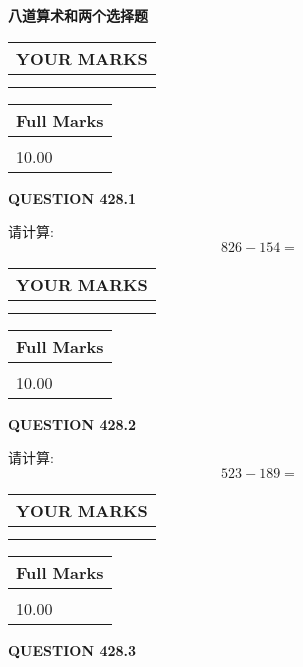 \documentclass{ctexart}
\begin{document}
   
 \vspace{0.2in}
{\LARGE {\textbf{ 八道算术和两个选择题}}}
   
   
  
\vspace{0.2in}
  
\noindent\begin{tabular}{|l|}
\hline
 YOUR MARKS  \\
\hline
 \\ 
 \\ 
\hline
\end{tabular}
\hspace{0.05in} \begin{tabular}{|l|}
\hline
 Full Marks  \\
\hline
 \\ 
10.00 \\
\hline
\end{tabular}
{\textbf{\Large{QUESTION
428.1 
}}}
  
  
 
请计算:
\begin{equation}
826 -   %
154 = \nonumber
\end{equation}
 

 

 
  
\vspace{0.2in}
  
\noindent\begin{tabular}{|l|}
\hline
 YOUR MARKS  \\
\hline
 \\ 
 \\ 
\hline
\end{tabular}
\hspace{0.05in} \begin{tabular}{|l|}
\hline
 Full Marks  \\
\hline
 \\ 
10.00 \\
\hline
\end{tabular}
{\textbf{\Large{QUESTION
428.2 
}}}
  
  
 
请计算:
\begin{equation}
523 -   %
189 = \nonumber
\end{equation}
 

 

 
  
\vspace{0.2in}
  
\noindent\begin{tabular}{|l|}
\hline
 YOUR MARKS  \\
\hline
 \\ 
 \\ 
\hline
\end{tabular}
\hspace{0.05in} \begin{tabular}{|l|}
\hline
 Full Marks  \\
\hline
 \\ 
10.00 \\
\hline
\end{tabular}
{\textbf{\Large{QUESTION
428.3 
}}}
  
\end{document}
